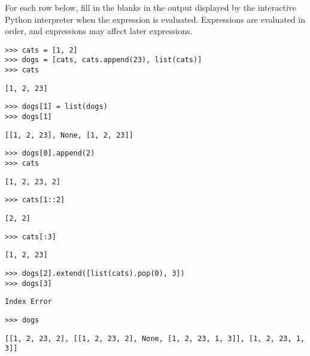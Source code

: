 \question For each row below, fill in the blanks in the output displayed by the
interactive Python interpreter when the expression is evaluated. Expressions
 are evaluated in order, and expressions may affect later expressions.

\begin{lstlisting}
>>> cats = [1, 2]
>>> dogs = [cats, cats.append(23), list(cats)]
>>> cats
\end{lstlisting}
\begin{solution}[.3in]
\begin{lstlisting}
[1, 2, 23]
\end{lstlisting}
\end{solution}

\begin{lstlisting}
>>> dogs[1] = list(dogs)
>>> dogs[1]
\end{lstlisting}
\begin{solution}[.3in]
\begin{lstlisting}
[[1, 2, 23], None, [1, 2, 23]]
\end{lstlisting}
\end{solution}

\begin{lstlisting}
>>> dogs[0].append(2)
>>> cats
\end{lstlisting}
\begin{solution}[.3in]
\begin{lstlisting}
[1, 2, 23, 2]
\end{lstlisting}
\end{solution}

\begin{lstlisting}
>>> cats[1::2]
\end{lstlisting}
\begin{solution}[.3in]
\begin{lstlisting}
[2, 2]
\end{lstlisting}
\end{solution}

\begin{lstlisting}
>>> cats[:3]
\end{lstlisting}
\begin{solution}[.3in]
\begin{lstlisting}
[1, 2, 23]
\end{lstlisting}
\end{solution}

\begin{lstlisting}
>>> dogs[2].extend([list(cats).pop(0), 3])
>>> dogs[3]
\end{lstlisting}
\begin{solution}[.3in]
\begin{lstlisting}
Index Error
\end{lstlisting}
\end{solution}

\begin{lstlisting}
>>> dogs
\end{lstlisting}
\begin{solution}[.3in]
\begin{lstlisting}
[[1, 2, 23, 2], [[1, 2, 23, 2], None, [1, 2, 23, 1, 3]], [1, 2, 23, 1, 3]]
\end{lstlisting}
\end{solution}
